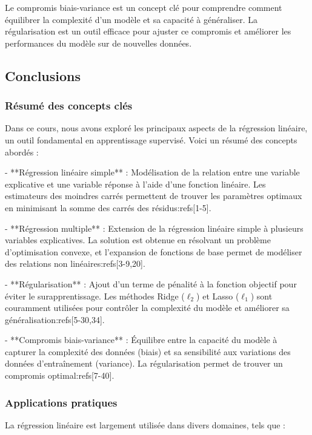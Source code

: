 \documentclass[10pt,a4paper]{article}
\begin{document}
Le compromis biais-variance est un concept clé pour comprendre comment équilibrer la complexité d'un modèle et sa capacité à généraliser. La régularisation est un outil efficace pour ajuster ce compromis et améliorer les performances du modèle sur de nouvelles données.

\subsection*{Conclusions}

\subsubsection*{Résumé des concepts clés}

Dans ce cours, nous avons exploré les principaux aspects de la régression linéaire, un outil fondamental en apprentissage supervisé. Voici un résumé des concepts abordés :

- **Régression linéaire simple** : Modélisation de la relation entre une variable explicative et une variable réponse à l'aide d'une fonction linéaire. Les estimateurs des moindres carrés permettent de trouver les paramètres optimaux en minimisant la somme des carrés des résidus:refs[1-5].

- **Régression multiple** : Extension de la régression linéaire simple à plusieurs variables explicatives. La solution est obtenue en résolvant un problème d'optimisation convexe, et l'expansion de fonctions de base permet de modéliser des relations non linéaires:refs[3-9,20].

- **Régularisation** : Ajout d'un terme de pénalité à la fonction objectif pour éviter le surapprentissage. Les méthodes Ridge ($\ell_2$) et Lasso ($\ell_1$) sont couramment utilisées pour contrôler la complexité du modèle et améliorer sa généralisation:refs[5-30,34].

- **Compromis biais-variance** : Équilibre entre la capacité du modèle à capturer la complexité des données (biais) et sa sensibilité aux variations des données d'entraînement (variance). La régularisation permet de trouver un compromis optimal:refs[7-40].

\subsubsection*{Applications pratiques}

La régression linéaire est largement utilisée dans divers domaines, tels que :
\end{document}
